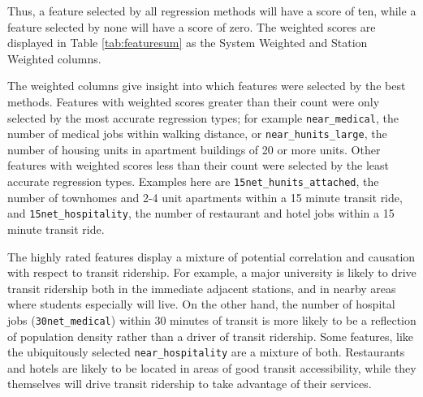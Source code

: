 \documentclass[11pt]{article}
\begin{document}
Thus, a feature selected by all regression methods will have a score of ten, while a feature selected by none will have a score of zero. The weighted scores are displayed in Table \ref{tab:featuresum} as the System Weighted and Station Weighted columns. 

The weighted columns give insight into which features were selected by the best methods. Features with weighted scores greater than their count were only selected by the most accurate regression types; for example \texttt{near\_medical}, the number of medical jobs within walking distance, or \texttt{near\_hunits\_large}, the number of housing units in apartment buildings of 20 or more units. Other features with weighted scores less than their count were selected by the least accurate regression types. Examples here are \texttt{15net\_hunits\_attached}, the number of townhomes and 2-4 unit apartments within a 15 minute transit ride, and \texttt{15net\_hospitality}, the number of restaurant and hotel jobs within a 15 minute transit ride. 

The highly rated features display a mixture of potential correlation and causation with respect to transit ridership. For example, a major university is likely to drive transit ridership both in the immediate adjacent stations, and in nearby areas where students especially will live. On the other hand, the number of hospital jobs (\texttt{30net\_medical}) within 30 minutes of transit is more likely to be a reflection of population density rather than a driver of transit ridership. Some features, like the ubiquitously selected \texttt{near\_hospitality} are a mixture of both. Restaurants and hotels are likely to be located in areas of good transit accessibility, while they themselves will drive transit ridership to take advantage of their services. 
\end{document}
